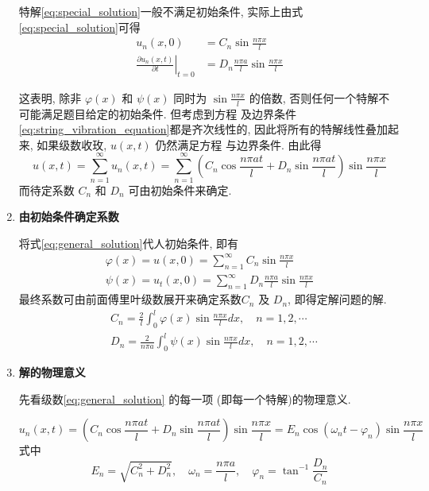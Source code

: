 \begin{enumerate}
    特解\eqref{eq:special_solution}一般不满足初始条件, 实际上由式\eqref{eq:special_solution}可得 
    $$
    \begin{aligned}
    u_{n}(x, 0) & =C_{n} \sin \frac{n \pi x}{l} \\
    \left.\frac{\partial u_{n}(x, t)}{\partial t}\right|_{t=0} & =D_{n} \frac{n \pi a}{l} \sin \frac{n \pi x}{l}
    \end{aligned}
    $$

    这表明, 除非 $\varphi(x)$ 和 $\psi(x)$ 同时为 $\sin \frac{n \pi x}{l}$ 的倍数,
     否则任何一个特解不可能满足题目给定的初始条件. 
     但考虑到方程  及边界条件\eqref{eq:string_vibration_equation}都是齐次线性的, 
     因此将所有的特解线性叠加起来, 如果级数收玫, $u(x, t)$ 仍然满足方程 与边界条件. 由此得
    \begin{equation}
        u(x, t)=\sum_{n=1}^{\infty} u_{n}(x, t)=
        \sum_{n=1}^{\infty}\left(C_{n} \cos \frac{n \pi a t}{l}+
        D_{n} \sin \frac{n \pi a t}{l}\right) \sin \frac{n \pi x}{l}
        \label{eq:general_solution}
    \end{equation}
    而待定系数 $C_{n}$ 和 $D_{n}$ 可由初始条件来确定.
    

    \item \textbf{由初始条件确定系数} 
    
        将式\eqref{eq:general_solution}代人初始条件, 即有
        $$
        \begin{gathered}
        \varphi(x)=u(x, 0)=\sum_{n=1}^{\infty} C_{n} \sin \frac{n \pi x}{l} \\
        \psi(x)=u_{t}(x, 0)=\sum_{n=1}^{\infty} D_{n} \frac{n \pi a}{l} \sin \frac{n \pi x}{l}
        \end{gathered}
        $$
        最终系数可由前面傅里叶级数展开来确定系数$C_{n}$ 及 $D_{n}$, 即得定解问题的解.
        $$
        \begin{aligned}
        & C_{n}=\frac{2}{l} \int_{0}^{l} \varphi(x) \sin \frac{n \pi x}{l} d x, \quad n=1,2, \cdots \\
        & D_{n}=\frac{2}{n \pi a} \int_{0}^{l} \psi(x) \sin \frac{n \pi x}{l} d x, \quad n=1,2, \cdots
        \end{aligned}
        $$


        \item \textbf{解的物理意义}
        
        先看级数\eqref{eq:general_solution} 的每一项 (即每一个特解)的物理意义.

        \begin{equation}
            u_{n}(x, t)=\left(C_{n} \cos \frac{n \pi a t}{l}+D_{n} \sin \frac{n \pi a t}{l}\right) \sin \frac{n \pi x}{l}
            =E_{n} \cos \left(\omega_{n} t-\varphi_{n}\right) \sin \frac{n \pi x}{l}
            \label{eq:solution_2}
        \end{equation}    
        式中
        $$
        E_{n}=\sqrt{C_{n}^{2}+D_{n}^{2}}, 
            \quad \omega_{n}=\frac{n \pi a}{l}, 
            \quad \varphi_{n}=\tan ^{-1} \frac{D_{n}}{C_{n}}
        $$
        

\end{enumerate}
